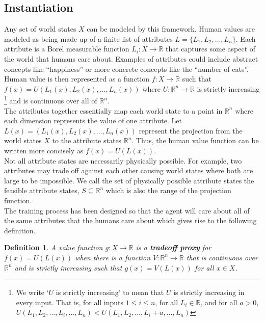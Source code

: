 \documentclass{article}
\newtheorem{Definition}{Definition}[section] \crefname{Definition}{Definition}{Definitions}
\begin{document}
\subsection{Instantiation}
Any set of world states $X$ can be modeled by this framework. Human values are modeled as being made up of a finite list of attributes $L = \{L_1, L_2, \dots , L_n\}$. Each attribute is a Borel measurable function $L_i : X \rightarrow \mathbb R$ that captures some aspect of the world that humans care about. Examples of attributes could include abstract concepts like ``happiness'' or more concrete concepts like the ``number of cats''. Human value is then represented as a function $f : X \rightarrow \mathbb R$ such that $f(x) = U(L_1(x), L_2(x), \dots, L_n(x))$ where $U : \mathbb R^n \rightarrow \mathbb R$ is strictly increasing \footnote{We write `$U$ is strictly increasing' to mean that $U$ is strictly increasing in every input. That is, for all inputs $1 \leq i \leq n$, for all $L_i \in \mathbb R$, and for all $a > 0$, $U(L_1, L_2, \dots,  L_i, \dots , L_n) < U(L_1, L_2, \dots,  L_i + a, \dots , L_n)$} and is continuous over all of $\mathbb R^n$.\\

The attributes together essentially map each world state to a point in $\mathbb R^n$ where each dimension represents the value of one attribute. Let $L(x) = (L_1(x), L_2(x), \dots, L_n(x))$ represent the projection from the world states $X$ to the attribute states $\mathbb R^n$. Thus, the human value function can be written more concisely as $f(x) = U(L(x))$.\\

Not all attribute states are necessarily physically possible. For example, two attributes may trade off against each other causing world states where both are large to be impossible. We call the set of physically possible attribute states the feasible attribute states, $S \subseteq \mathbb R^n$ which is also the range of the projection function.\\

The training process has been designed so that the agent will care about all of the same attributes that the humans care about which gives rise to the following definition.

\begin{Definition}\label{def:attributeProxy}
A value function $g : X \rightarrow \mathbb R$ is a \textbf{tradeoff proxy} for $f(x) = U(L(x))$ when there is a function $V : \mathbb R^n \rightarrow \mathbb R$ that is continuous over $\mathbb R^n$ and is strictly increasing such that $g(x) = V(L(x))$ for all $x \in X$.
\end{Definition}
\end{document}
